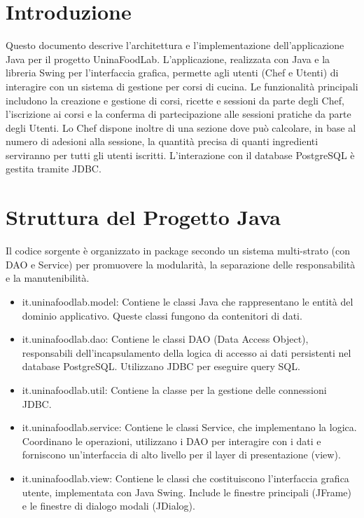 \documentclass[a4paper, 12pt]{article}
\begin{document}
\newpage
\tableofcontents
\newpage

\section{Introduzione}
Questo documento descrive l'architettura e l'implementazione dell'applicazione Java per il progetto UninaFoodLab. L'applicazione, realizzata con Java e la libreria Swing per l'interfaccia grafica, permette agli utenti (Chef e Utenti) di interagire con un sistema di gestione per corsi di cucina. Le funzionalità principali includono la creazione e gestione di corsi, ricette e sessioni da parte degli Chef, l'iscrizione ai corsi e la conferma di partecipazione alle sessioni pratiche da parte degli Utenti. Lo Chef dispone inoltre di una sezione dove può calcolare, in base al numero di adesioni alla sessione, la quantità precisa di quanti ingredienti serviranno per tutti gli utenti iscritti. L'interazione con il database PostgreSQL è gestita tramite JDBC.

\section{Struttura del Progetto Java}
Il codice sorgente è organizzato in package secondo un sistema multi-strato (con DAO e Service) per promuovere la modularità, la separazione delle responsabilità e la manutenibilità.

\begin{itemize}
    \item it.uninafoodlab.model: Contiene le classi Java che rappresentano le entità del dominio applicativo. Queste classi fungono da contenitori di dati.
    \item it.uninafoodlab.dao: Contiene le classi DAO (Data Access Object), responsabili dell'incapsulamento della logica di accesso ai dati persistenti nel database PostgreSQL. Utilizzano JDBC per eseguire query SQL.
    \item it.uninafoodlab.util: Contiene la classe per la gestione delle connessioni JDBC.
    \item it.uninafoodlab.service: Contiene le classi Service, che implementano la logica. Coordinano le operazioni, utilizzano i DAO per interagire con i dati e forniscono un'interfaccia di alto livello per il layer di presentazione (view).
    \item it.uninafoodlab.view: Contiene le classi che costituiscono l'interfaccia grafica utente, implementata con Java Swing. Include le finestre principali (JFrame) e le finestre di dialogo modali (JDialog).
\end{itemize}
\end{document}
